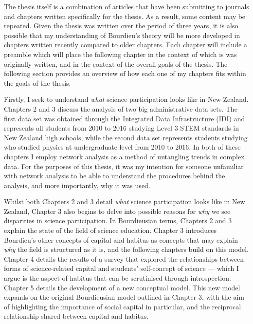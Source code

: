 The thesis itself is a combination of articles that have been submitting to journals and chapters written specifically for the thesis. As a result, some content may be repeated. Given the thesis was written over the period of three years, it is also possible that my understanding of Bourdieu's theory will be more developed in chapters written recently compared to older chapters. Each chapter will include a preamble which will place the following chapter in the context of which is was originally written, and in the context of the overall goals of the thesis. The following section provides an overview of how each one of my chapters fits within the goals of the thesis. 

Firstly, I seek to understand \textit{what} science participation looks like in New Zealand. Chapters 2 and 3 discuss the analysis of two big administrative data sets. The first data set was obtained through the Integrated Data Infrastructure (IDI) and represents all students from 2010 to 2016 studying Level 3 STEM standards in New Zealand high schools, while the second data set represents students studying who studied physics at undergraduate level from 2010 to 2016. In both of these chapters I employ network analysis as a method of untangling trends in complex data. For the purposes of this thesis, it was my intention for someone unfamiliar with network analysis to be able to understand the procedures behind the analysis, and more importantly, why it was used. 

Whilst both Chapters 2 and 3 detail \textit{what} science participation looks like in New Zealand, Chapter 3 also begins to delve into possible reasons for \textit{why} we see disparities in science participation. In Bourdieusian terms, Chapters 2 and 3 explain the state of the field of science education. Chapter 3 introduces Bourdieu's other concepts of capital and habitus as concepts that may explain \textit{why} the field is structured as it is, and the following chapters build on this model. Chapter 4 details the results of a survey that explored the relationships between forms of science-related capital and students' self-concept of science --- which I argue is the aspect of habitus that can be scrutinised through introspection. Chapter 5 details the development of a new conceptual model. This new model expands on the original Bourdieusian model outlined in Chapter 3, with the aim of highlighting the importance of social capital in particular, and the reciprocal relationship shared between capital and habitus. 

